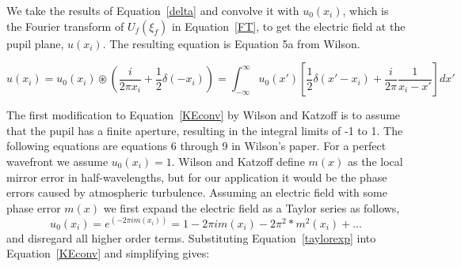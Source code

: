 


We take the results of Equation~\ref{delta} and convolve it with $u_0(x_i)$, which is the Fourier transform of $U_f(\xi_f)$ in Equation~\ref{FT}, to get the electric field at the pupil plane, $u(x_i)$. The resulting equation is Equation 5a from Wilson.\cite{wilson1975wavefront}



\begin{equation}
    u(x_i)= u_0(x_i) \circledast \left(
        \frac{i}{2\pi x_i}+\frac{1}{2}\delta(-x_i)
    \right)
    =
    \int_{-\infty}^\infty
    u_0(x') \left[
        \frac{1}{2}\delta(x'-x_i)+\frac{i}{2\pi}\frac{1}{x_i-x'}
    \right] dx' 
    \label{KEconv}
\end{equation}

The first modification to Equation~\ref{KEconv} by Wilson and Katzoff is to assume that the pupil has a finite aperture, resulting in the integral limits of -1 to 1. The following equations are equations 6 through 9 in Wilson's paper.\cite{wilson1975wavefront} For a perfect wavefront we assume $u_0 (x_i )=1$.  Wilson and Katzoff define $m(x)$ as the local mirror error in half-wavelengths, but for our application it would be the phase errors caused by atmospheric turbulence. Assuming an electric field with some phase error $m(x)$ we first expand the electric field as a Taylor series as follows,
\begin{equation}
    u_0 (x_i )=e^{(-2\pi i m(x_i ))}=1-2\pi i m(x_i )-2\pi^2*m^2 (x_i )+...
    \label{taylorexp}
\end{equation}
and disregard all higher order terms. Substituting Equation~\ref{taylorexp} into Equation~\ref{KEconv} and simplifying gives:

